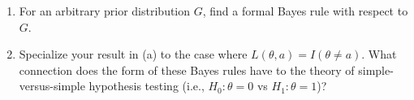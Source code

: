 \documentclass[11pt]{article}
\begin{document}
\begin{enumerate}
\begin{enumerate}
\item For an arbitrary prior distribution $G$, find a formal Bayes rule with respect to $G$.
\item Specialize your result in (a) to the case where $L(\theta,a)=I(\theta\neq a)$.  What connection does the form of these Bayes rules have to the theory of simple-versus-simple hypothesis testing (i.e., $H_0:\theta=0$ vs $H_1:\theta=1$)?
\end{enumerate}
\end{enumerate}
\end{document}
